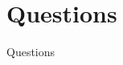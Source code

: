 \documentclass[serif,mathserif,compress]{beamer}
\begin{document}
%
%
%

\section{Questions}

\begin{frame}{Questions}
\end{frame}
\end{document}
